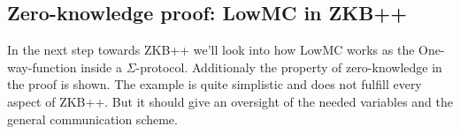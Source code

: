 \documentclass[]{article}
\begin{document}
\subsection{Zero-knowledge proof: LowMC in ZKB++}
In the next step towards ZKB++ we'll look into how LowMC works as the One-way-function inside a $\Sigma$-protocol. Additionaly the property of zero-knowledge in the proof is shown. The example is quite simplistic and does not fulfill every aspect of ZKB++. But it should give an oversight of the needed variables and the general communication scheme.\\ \\


\end{document}
